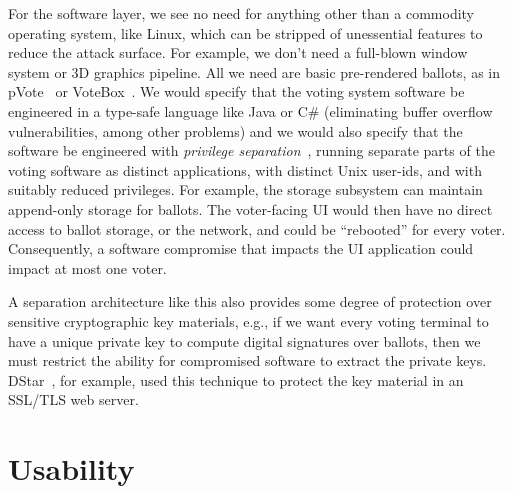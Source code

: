\documentclass[letterpaper, 10pt, twocolumn]{article}
\begin{document}
For the software layer, we see no need for anything other than a commodity operating system, like Linux, which can be stripped of unessential features to reduce the attack surface. For example, we don't need a full-blown window system or 3D graphics pipeline. All we need are basic pre-rendered ballots, as in pVote~\cite{yee06prui,yee07pvote} or VoteBox~\cite{sandler08votebox}. We would specify that the voting system software be engineered in a type-safe language like Java or C\# (eliminating buffer overflow vulnerabilities, among other problems) and we would also specify that the software be engineered with {\em privilege separation}~\cite{PFH03}, running separate parts of the voting software as distinct applications, with distinct Unix user-ids, and with suitably reduced privileges. For example, the storage subsystem can maintain append-only storage for ballots. The voter-facing UI would then have no direct access to ballot storage, or the network, and could be ``rebooted'' for every voter. Consequently, a software compromise that impacts the UI application could impact at most one voter.

A separation architecture like this also provides some degree of protection over sensitive cryptographic key materials, e.g., if we want every voting terminal to have a unique private key to compute digital signatures over ballots, then we must restrict the ability for compromised software to extract the private keys. DStar~\cite{dstar2008}, for example, used this technique to protect the key material in an SSL/TLS web server.

\section{Usability}
\end{document}
